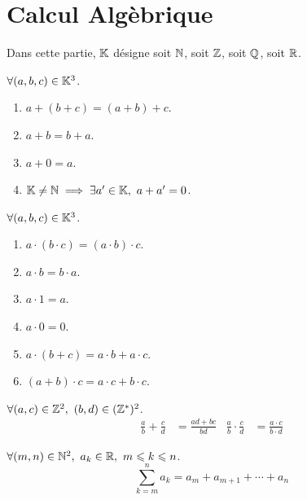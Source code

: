 \chapter{Calcul Algèbrique}
\par \noindent Dans cette partie, $\mathbb{K}$ désigne soit $\mathbb{N}$, soit $\mathbb{Z}$, soit $\mathbb{Q}$, soit $\mathbb{R}$.

\begin{axiom}
    $\forall (a, b, c) \in \mathbb{K}^3$.
    \begin{enumerate}
    	\item $a + (b + c) = (a + b) + c$.
    	\item $a + b = b + a$.
    	\item $a + 0 = a$.
    	\item $\mathbb{K} \neq \mathbb{N} \implies \exists a' \in \mathbb{K},\ a + a' = 0$.
    \end{enumerate}
\end{axiom}

\begin{axiom}
    $\forall (a, b, c) \in \mathbb{K}^3$. 
    \begin{enumerate}
    	\item $a \cdot (b \cdot c) = (a \cdot b) \cdot c$.
    	\item $a \cdot b = b \cdot a$.
    	\item $a \cdot 1 = a$.
    	\item $a \cdot 0 = 0$.
    	\item $a \cdot (b + c) = a \cdot b + a \cdot c$.
    	\item $(a + b) \cdot c = a \cdot c + b \cdot c$.
    \end{enumerate}
\end{axiom}

\begin{proposition}
    $\forall (a, c) \in \mathbb{Z}^2,\ (b, d) \in (\mathbb{Z}^*)^2$.
    \begin{align*}
        \frac{a}{b} + \frac{c}{d} &= \frac{ad + bc}{bd} & \frac{a}{b} \cdot \frac{c}{d} &= \frac{a \cdot c}{b \cdot d}
    \end{align*}
\end{proposition}

\begin{definition}[Somme]
    $\forall (m, n) \in \mathbb{N}^2,\ a_k \in \mathbb{R},\ m \leqslant k \leqslant n$.
    \[ \sum_{k = m}^n a_k = a_m + a_{m + 1} + \cdots + a_n \]
\end{definition}


